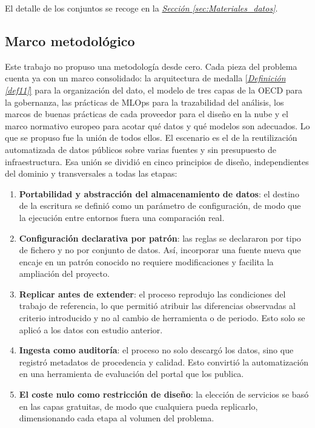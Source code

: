El detalle de los conjuntos se recoge en la \hyperref[sec:Materiales_datos]{\textit{Sección \ref*{sec:Materiales_datos}}}.


\subsection{Marco metodológico} \label{sec:Metodos_marco}

Este trabajo no propuso una metodología desde cero. Cada pieza del problema cuenta ya con un marco consolidado: la arquitectura de medalla \hyperref[def11]{[\textit{Definición \ref*{def11}}]} para la organización del dato, el modelo de tres capas de la OECD \citep{OECD2019} para la gobernanza, las prácticas de MLOps \citep{Kreuzberger2023MLOps} para la trazabilidad del análisis, los marcos de buenas prácticas de cada proveedor \citep{AWSWellArchitected2026, GCPArchitectureFramework2026} para el diseño en la nube y el marco normativo europeo para acotar qué datos y qué modelos son adecuados. Lo que se propuso fue la unión de todos ellos. El escenario es el de la reutilización automatizada de datos públicos sobre varias fuentes y sin presupuesto de infraestructura. Esa unión se dividió en cinco principios de diseño, independientes del dominio y transversales a todas las etapas:

\begin{enumerate}
	\item \textbf{Portabilidad y abstracción del almacenamiento de datos}: el destino de la escritura se definió como un parámetro de configuración, de modo que la ejecución entre entornos fuera una comparación real.
	\item \textbf{Configuración declarativa por patrón}: las reglas se declararon por tipo de fichero y no por conjunto de datos. Así, incorporar una fuente nueva que encaje en un patrón conocido no requiere modificaciones y facilita la ampliación del proyecto.
	\item \textbf{Replicar antes de extender}: el proceso reprodujo las condiciones del trabajo de referencia, lo que permitió atribuir las diferencias observadas al criterio introducido y no al cambio de herramienta o de periodo. Esto solo se aplicó a los datos con estudio anterior.
	\item \textbf{Ingesta como auditoría}: el proceso no solo descargó los datos, sino que registró metadatos de procedencia y calidad. Esto convirtió la automatización en una herramienta de evaluación del portal que los publica.
	\item \textbf{El coste nulo como restricción de diseño}: la elección de servicios se basó en las capas gratuitas, de modo que cualquiera pueda replicarlo, dimensionando cada etapa al volumen del problema.
\end{enumerate}

